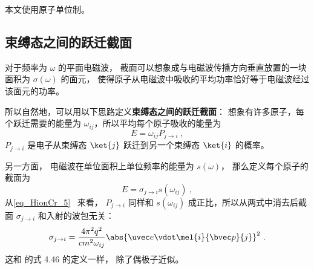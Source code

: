 
\begin{issues}
\issueDraft
\end{issues}

本文使用原子单位制。

\subsection{束缚态之间的跃迁截面}
对于频率为 $\omega$ 的平面电磁波， 截面可以想象成与电磁波传播方向垂直放置的一块面积为 $\sigma(\omega)$ 的面元， 使得原子从电磁波中吸收的平均功率恰好等于电磁波经过该面元的功率。

所以自然地，可以用以下思路定义\textbf{束缚态之间的跃迁截面}： 想象有许多原子，每个跃迁需要的能量为 $\omega_{ij}$，所以平均每个原子吸收的能量为
\begin{equation}
E = \omega_{ij}P_{j\to i}~,
\end{equation}
$P_{j\to i}$ 是电子从束缚态 $\ket{j}$ 跃迁到另一个束缚态 $\ket{i}$ 的概率。

另一方面， 电磁波在单位面积上单位频率的能量为 $s(\omega)$， 那么定义每个原子的截面为
\begin{equation}
E = \sigma_{j\to i} s(\omega_{ij})~,
\end{equation}
从\autoref{eq_HionCr_5}~ 来看， $P_{j\to i}$ 同样和 $s(\omega_{ij})$ 成正比，所以从两式中消去后截面 $\sigma_{j\to i}$ 和入射的波包无关：
\begin{equation}
\sigma_{j\to i} = \frac{4\pi^2 q^2}{c m^2 \omega_{ij}} \abs{\uvec e \vdot\mel{i}{\bvec p}{j}}^2~.
\end{equation}
这和 \cite{Bransden} 的式 4.46 的定义一样， 除了偶极子近似。

